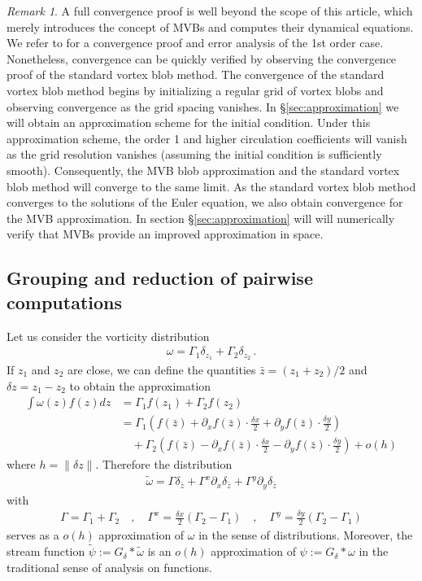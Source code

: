 \documentclass[12pt]{amsart}
\theoremstyle{remark}
\newtheorem{rmk}[thm]{Remark}
\begin{document}
\begin{rmk}
A full convergence proof is well beyond the scope of this article,
which merely introduces the concept of MVBs and computes their dynamical equations.
We refer to \cite{ChiuNivolaides1988} for a convergence proof and error analysis of the 1st order case.
Nonetheless, convergence can be quickly verified by observing the convergence proof of the standard vortex blob method.
The convergence of the standard vortex blob method begins by initializing a regular grid of vortex blobs
and observing convergence as the grid spacing vanishes.
In \S \ref{sec:approximation} we will obtain an approximation scheme for the initial condition.
Under this approximation scheme, the order 1 and higher circulation coefficients will vanish as the 
grid resolution vanishes (assuming the initial condition is sufficiently smooth).
Consequently, the MVB blob approximation and the standard vortex blob method will converge to the same limit.
As the standard vortex blob method converges to the solutions of the Euler equation, we also obtain convergence for the MVB approximation.
In section \S \ref{sec:approximation} will will numerically verify that MVBs provide an improved approximation in space.
\end{rmk}

\subsection{Grouping and reduction of pairwise computations}
\label{sec:grouping}

Let us consider the vorticity distribution
\begin{align*}
	\omega = \Gamma_1 \delta_{z_1} + \Gamma_2 \delta_{z_2}\,.
\end{align*}
If $z_1$ and $z_2$ are close, we can define the quantities $\bar{z} = (z_1+z_2)/2$ and $\delta z = z_1 - z_2 $ to obtain the approximation
\begin{align*}
	\int \omega(z) f(z)dz &= \Gamma_1 f(z_1) + \Gamma_2 f(z_2) \\
		&= \Gamma_1 \left( f(\bar{z}) + \partial_x f(\bar{z}) \cdot \frac{\delta x}{2} + \partial_y f(\bar{z}) \cdot \frac{\delta y}{2}  \right)\\
		&\quad + \Gamma_2 \left( f(\bar{z}) - \partial_x f(\bar{z}) \cdot \frac{\delta x}{2} - \partial_y f(\bar{z}) \cdot \frac{\delta y}{2}  \right) + o( h ) 
\end{align*}
where $h = \| \delta z \|$.
Therefore the distribution
\begin{align*}
	\tilde{\omega} = \Gamma \delta_{\bar{z}} + \Gamma^x \partial_x \delta_{\bar{z}} + \Gamma^y \partial_y \delta_{\bar{z}}
\end{align*}
with 
\begin{align*}
	\Gamma = \Gamma_1 + \Gamma_2 \quad,\quad \Gamma^x = \frac{\delta x}{2} (\Gamma_2 -\Gamma_1) \quad,\quad \Gamma^y = \frac{\delta y}{2} (\Gamma_2 -\Gamma_1)
\end{align*}
serves as a $o(h)$ approximation of $\omega$ in the sense of distributions.
Moreover, the stream function $\tilde{\psi} := G_\delta * \tilde{\omega}$ is an $o(h)$ approximation of $\psi := G_\delta * \omega$ in the traditional sense of analysis on functions.
\end{document}
